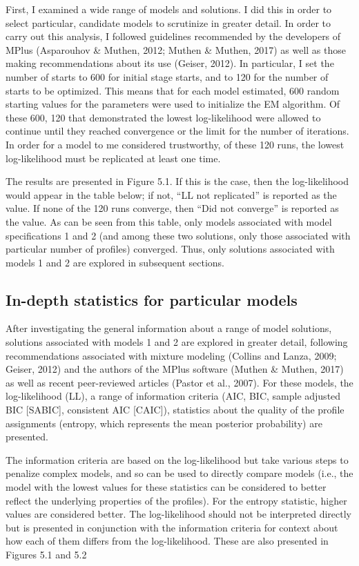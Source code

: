 \documentclass[]{msu-thesis}
\theoremstyle{definition}
\theoremstyle{definition}
\theoremstyle{definition}
\theoremstyle{remark}
\begin{document}
First, I examined a wide range of models and solutions. I did this in
order to select particular, candidate models to scrutinize in greater
detail. In order to carry out this analysis, I followed guidelines
recommended by the developers of MPlus (Asparouhov \& Muthen, 2012;
Muthen \& Muthen, 2017) as well as those making recommendations about
its use (Geiser, 2012). In particular, I set the number of starts to 600
for initial stage starts, and to 120 for the number of starts to be
optimized. This means that for each model estimated, 600 random starting
values for the parameters were used to initialize the EM algorithm. Of
these 600, 120 that demonstrated the lowest log-likelihood were allowed
to continue until they reached convergence or the limit for the number
of iterations. In order for a model to me considered trustworthy, of
these 120 runs, the lowest log-likelihood must be replicated at least
one time.

The results are presented in Figure 5.1. If this is the case, then the
log-likelihood would appear in the table below; if not, ``LL not
replicated'' is reported as the value. If none of the 120 runs converge,
then ``Did not converge'' is reported as the value. As can be seen from
this table, only models associated with model specifications 1 and 2
(and among these two solutions, only those associated with particular
number of profiles) converged. Thus, only solutions associated with
models 1 and 2 are explored in subsequent sections.

\subsection{In-depth statistics for particular
models}\label{in-depth-statistics-for-particular-models}

After investigating the general information about a range of model
solutions, solutions associated with models 1 and 2 are explored in
greater detail, following recommendations associated with mixture
modeling (Collins and Lanza, 2009; Geiser, 2012) and the authors of the
MPlus software (Muthen \& Muthen, 2017) as well as recent peer-reviewed
articles (Pastor et al., 2007). For these models, the log-likelihood
(LL), a range of information criteria (AIC, BIC, sample adjusted BIC
{[}SABIC{]}, consistent AIC {[}CAIC{]}), statistics about the quality of
the profile assignments (entropy, which represents the mean posterior
probability) are presented.

The information criteria are based on the log-likelihood but take
various steps to penalize complex models, and so can be used to directly
compare models (i.e., the model with the lowest values for these
statistics can be considered to better reflect the underlying properties
of the profiles). For the entropy statistic, higher values are
considered better. The log-likelihood should not be interpreted directly
but is presented in conjunction with the information criteria for
context about how each of them differs from the log-likelihood. These
are also presented in Figures 5.1 and 5.2
\end{document}
